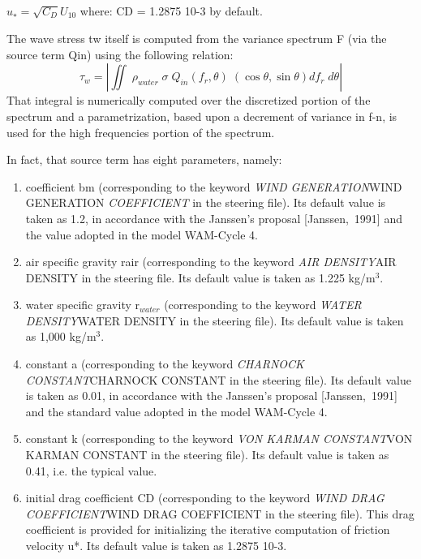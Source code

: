 $u_{*}^{} =\sqrt{C_{D} } U_{10} $ where: CD = 1.2875 10-3 by default.

 The wave stress tw itself is computed from the variance spectrum F (via the source term Qin) using the following relation:
\begin{equation} \label{GrindEQ__4_32_}
\tau _{w} =\left|\iint \;  \rho _{water} \; \sigma \; Q_{in} (f_{r} ,\theta )\; \left(\cos \theta ,\sin \theta \right)df_{r} \; d\theta \right|
\end{equation}
That integral is numerically computed over the discretized portion of the spectrum and a parametrization, based upon a decrement of variance in f-n, is used for the high frequencies portion of the spectrum.

In fact, that source term has eight parameters, namely:

\begin{enumerate}
\item  coefficient bm (corresponding to the keyword \textit{WIND GENERATION}WIND GENERATION\textit{ COEFFICIENT }in the steering file). Its default value is taken as 1.2, in accordance with the Janssen's proposal [Janssen,~1991] and the value adopted in the model WAM-Cycle 4.

\item  air specific gravity rair (corresponding to the keyword \textit{AIR DENSITY}AIR DENSITY\textit{ }in the steering file. Its default value is taken as 1.225 kg/m${}^{3}$.

\item  water specific gravity r${}_{water}$ (corresponding to the keyword \textit{WATER DENSITY}WATER DENSITY\textit{ }in the steering file). Its default value is taken as 1,000 kg/m${}^{3}$.

\item  constant a (corresponding to the keyword \textit{CHARNOCK CONSTANT}CHARNOCK CONSTANT\textit{ }in the steering file). Its default value is taken as 0.01, in accordance with the Janssen's proposal [Janssen,~1991] and the standard value adopted in the model WAM-Cycle 4.

\item  constant k (corresponding to the keyword \textit{VON KARMAN CONSTANT}VON KARMAN CONSTANT\textit{ }in the steering file). Its default value is taken as 0.41, i.e. the typical value.

\item  initial drag coefficient CD (corresponding to the keyword \textit{WIND DRAG COEFFICIENT}WIND DRAG COEFFICIENT\textit{ }in the steering file). This drag coefficient is provided for initializing the iterative computation of friction velocity u*. Its default value is taken as 1.2875 10-3.


\end{enumerate}
